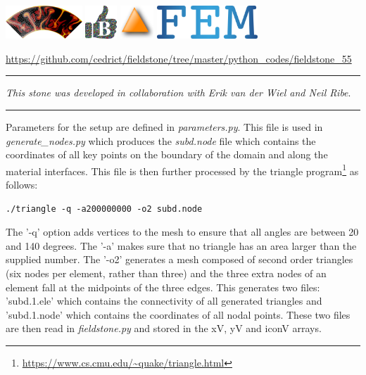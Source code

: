 \includegraphics[height=1.25cm]{images/pictograms/aspect_logo}
\includegraphics[height=1.25cm]{images/pictograms/benchmark}
\includegraphics[height=1.25cm]{images/pictograms/triangle}
\includegraphics[height=1.25cm]{images/pictograms/FEM}




\begin{center}
\url{https://github.com/cedrict/fieldstone/tree/master/python_codes/fieldstone_55}
\end{center}

\par\noindent\rule{\textwidth}{0.4pt}

{\sl This stone was developed in collaboration with Erik van der Wiel and Neil Ribe}. 

\par\noindent\rule{\textwidth}{0.4pt}



\vspace{1cm}

Parameters for the setup are defined in {\sl parameters.py}.
This file is used in {\sl generate\_nodes.py} which produces the
{\sl subd.node} file which contains the coordinates of all key points 
on the boundary of the domain and along the material interfaces.
This file is then further processed by the triangle 
program\footnote{\url{https://www.cs.cmu.edu/~quake/triangle.html}}
as follows:
\begin{verbatim}
./triangle -q -a200000000 -o2 subd.node
\end{verbatim}
The '-q' option adds vertices to the mesh to
ensure that all angles are between 20 and 140 degrees. 
The '-a' makes sure that no triangle has an area larger than 
the supplied number. The '-o2' generates a mesh composed 
of second order triangles (six nodes per element, rather than three) and the
three extra nodes of an element fall at the midpoints of the three edges.
This generates two files: 'subd.1.ele' which contains the connectivity 
of all generated triangles and 'subd.1.node' which contains the coordinates
of all nodal points. 
These two files are then read in {\sl fieldstone.py} and stored in the xV, yV and iconV arrays.

